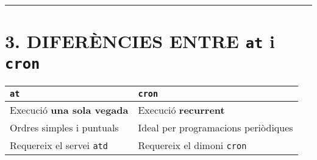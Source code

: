 \documentclass[
  12 pt,
  a4paper,
]{article}
\begin{document}
\begin{center}\rule{0.5\linewidth}{0.5pt}\end{center}

\section{\texorpdfstring{3. DIFERÈNCIES ENTRE \texttt{at} i
\texttt{cron}}{3. DIFERÈNCIES ENTRE at i cron}}\label{diferuxe8ncies-entre-at-i-cron}

\begin{longtable}[]{@{}ll@{}}
\toprule\noalign{}
\textbf{\texttt{at}} & \textbf{\texttt{cron}} \\
\midrule\noalign{}
\endhead
\bottomrule\noalign{}
\endlastfoot
Execució \textbf{una sola vegada} & Execució \textbf{recurrent} \\
Ordres simples i puntuals & Ideal per programacions periòdiques \\
Requereix el servei \texttt{atd} & Requereix el dimoni \texttt{cron} \\
\end{longtable}
\end{document}
